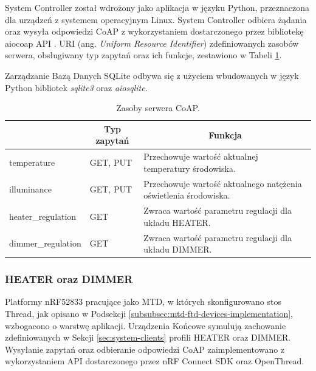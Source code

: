             System Controller został wdrożony jako aplikacja w języku Python, przeznaczona dla urządzeń z systemem operacyjnym Linux.
            System Controller odbiera żądania oraz wysyła odpowiedzi CoAP z wykorzystaniem dostarczonego przez bibliotekę aiocoap API \cite{aiocoap}. URI (ang. \textit{Uniform Resource Identifier}) zdefiniowanych zasobów serwera, obsługiwany typ zapytań oraz ich funkcje, zestawiono w Tabeli \ref{tab:resurces}.
            
            Zarządzanie Bazą Danych SQLite odbywa się z użyciem wbudowanych w język Python bibliotek \textit{sqlite3} oraz \textit{aiosqlite}.

            \begin{table}[H]
                \centering
                \caption{Zasoby serwera CoAP.}
                \begin{tabular}{|l|l|l|}
                     \hline
                     \rowcolor{gray!20}
                     \multicolumn{1}{|c|}{Zasób} & \multicolumn{1}{c|}{Typ zapytań} & \multicolumn{1}{c|}{Funkcja} \\
                     \hline
                     temperature & GET, PUT & Przechowuje wartość aktualnej temperatury środowiska.\\
                     \hline
                     illuminance & GET, PUT & Przechowuje wartość aktualnego natężenia oświetlenia środowiska.\\
                     \hline
                     heater\_regulation & GET & Zwraca wartość parametru regulacji dla układu HEATER.\\
                     \hline
                     dimmer\_regulation & GET & Zwraca wartość parametru regulacji dla układu DIMMER.\\
                     \hline
                \end{tabular}
                \label{tab:resurces}
            \end{table}
    
        \subsubsection{HEATER oraz DIMMER}

            Platformy nRF52833 pracujące jako MTD, w których skonfigurowano stos Thread, jak opisano w Podsekcji \ref{subsubsec:mtd-ftd-devices-implementation}, wzbogacono o warstwę aplikacji. Urządzenia Końcowe symulują zachowanie zdefiniowanych w Sekcji \ref{sec:system-clients} profili HEATER oraz DIMMER. Wysyłanie zapytań oraz odbieranie odpowiedzi CoAP zaimplementowano z wykorzystaniem API dostarczonego przez nRF Connect SDK oraz OpenThread.

